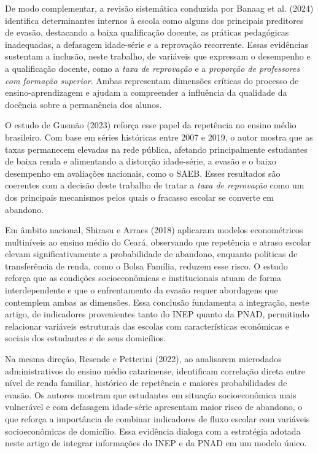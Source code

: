 \documentclass[english, spanish, brazilian]{RBIEarticle} %
\begin{document}
De modo complementar, a revisão sistemática conduzida por Banaag et al. (2024) identifica determinantes internos à escola como alguns dos principais preditores de evasão, destacando a baixa qualificação docente, as práticas pedagógicas inadequadas, a defasagem idade-série e a reprovação recorrente. Essas evidências sustentam a inclusão, neste trabalho, de variáveis que expressam o desempenho e a qualificação docente, como a \textit{taxa de reprovação} e a \textit{proporção de professores com formação superior}. Ambas representam dimensões críticas do processo de ensino-aprendizagem e ajudam a compreender a influência da qualidade da docência sobre a permanência dos alunos.

O estudo de Gusmão (2023) reforça esse papel da repetência no ensino médio brasileiro. Com base em séries históricas entre 2007 e 2019, o autor mostra que as taxas permanecem elevadas na rede pública, afetando principalmente estudantes de baixa renda e alimentando a distorção idade-série, a evasão e o baixo desempenho em avaliações nacionais, como o SAEB. Esses resultados são coerentes com a decisão deste trabalho de tratar a \textit{taxa de reprovação} como um dos principais mecanismos pelos quais o fracasso escolar se converte em abandono.

Em âmbito nacional, Shirasu e Arraes (2018) aplicaram modelos econométricos multiníveis ao ensino médio do Ceará, observando que repetência e atraso escolar elevam significativamente a probabilidade de abandono, enquanto políticas de transferência de renda, como o Bolsa Família, reduzem esse risco. O estudo reforça que as condições socioeconômicas e institucionais atuam de forma interdependente e que o enfrentamento da evasão requer abordagens que contemplem ambas as dimensões. Essa conclusão fundamenta a integração, neste artigo, de indicadores provenientes tanto do INEP quanto da PNAD, permitindo relacionar variáveis estruturais das escolas com características econômicas e sociais dos estudantes e de seus domicílios.

Na mesma direção, Resende e Petterini (2022), ao analisarem microdados administrativos do ensino médio catarinense, identificam correlação direta entre nível de renda familiar, histórico de repetência e maiores probabilidades de evasão. Os autores mostram que estudantes em situação socioeconômica mais vulnerável e com defasagem idade-série apresentam maior risco de abandono, o que reforça a importância de combinar indicadores de fluxo escolar com variáveis socioeconômicas de domicílio. Essa evidência dialoga com a estratégia adotada neste artigo de integrar informações do INEP e da PNAD em um modelo único.
\end{document}
